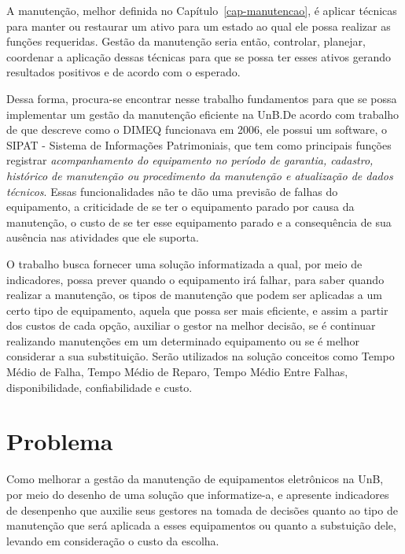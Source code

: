 A manutenção, melhor definida no Capítulo~\ref{cap-manutencao}, é aplicar técnicas para manter ou restaurar um ativo para um estado ao qual ele possa realizar as funções requeridas. Gestão da manutenção seria então, controlar, planejar, coordenar a aplicação dessas técnicas para que se possa ter esses ativos gerando resultados positivos e de acordo com o esperado.

Dessa forma, procura-se encontrar nesse trabalho fundamentos para que se possa implementar um gestão da manutenção eficiente na UnB.De acordo com trabalho de \cite{limacastilho2006} que descreve como o DIMEQ funcionava em 2006, ele possui um software, o SIPAT - Sistema de Informações Patrimoniais, que tem como principais funções registrar \emph{acompanhamento do equipamento no período de garantia, cadastro, histórico de manutenção ou procedimento da manutenção e atualização de dados técnicos}. Essas funcionalidades não te dão uma previsão de falhas do equipamento, a criticidade de se ter o equipamento parado por causa da manutenção, o custo de se ter esse equipamento parado e a consequência de sua ausência nas atividades que ele suporta.

O trabalho busca fornecer uma solução informatizada a qual, por meio de indicadores, possa prever quando o equipamento irá falhar, para saber quando realizar a manutenção, os tipos de manutenção que podem ser aplicadas a um certo tipo de equipamento, aquela que possa ser mais eficiente, e assim a partir dos custos de cada opção, auxiliar o gestor na melhor decisão, se é continuar realizando manutenções em um determinado equipamento ou se é melhor considerar a sua substituição. Serão utilizados na solução conceitos como Tempo Médio de Falha, Tempo Médio de Reparo, Tempo Médio Entre Falhas, disponibilidade, confiabilidade e custo. 



\section{Problema}

Como melhorar a gestão da manutenção de equipamentos eletrônicos na UnB, por meio do desenho de uma solução que informatize-a, e apresente indicadores de desenpenho que auxilie seus gestores na tomada de decisões quanto ao tipo de manutenção que será aplicada a esses equipamentos ou quanto a substuição dele, levando em consideração o custo da escolha. 


